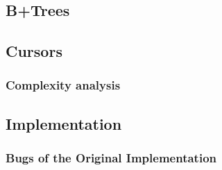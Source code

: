 \subsection{B+Trees}

\subsection{Cursors}
\subsubsection{Complexity analysis}

\subsection{Implementation}
\subsubsection{Bugs of the Original Implementation}
